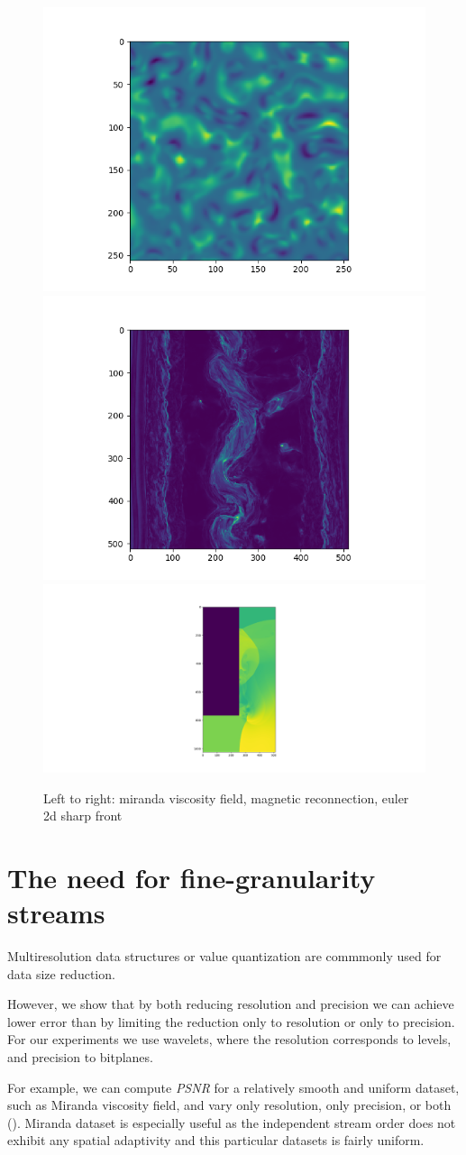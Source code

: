 \begin{figure}[!htb]
        \includegraphics[width=0.33\linewidth]{img/dataset/miranda-viscosity.png}
        \includegraphics[width=0.33\linewidth]{img/dataset/magnetic.png}
        \includegraphics[width=0.33\linewidth]{img/dataset/euler2d.png}
        \caption{Left to right: miranda viscosity field, magnetic reconnection, euler 2d sharp front}
        \label{fig:datasets}
\end{figure}

\section{The need for fine-granularity streams}
Multiresolution data structures or value quantization are commmonly used for data size
reduction.

However, we show that by both reducing resolution and precision we can achieve lower error
than by limiting the reduction only to resolution or only to precision. For our experiments
we use wavelets, where the resolution corresponds to levels, and precision to bitplanes.

For example, we can compute {\em PSNR} for a relatively smooth and uniform dataset, such as Miranda
viscosity field, and vary only resolution, only precision, or both (). Miranda
dataset is especially useful as the independent stream order does not exhibit any spatial adaptivity and
this particular datasets is fairly uniform.

